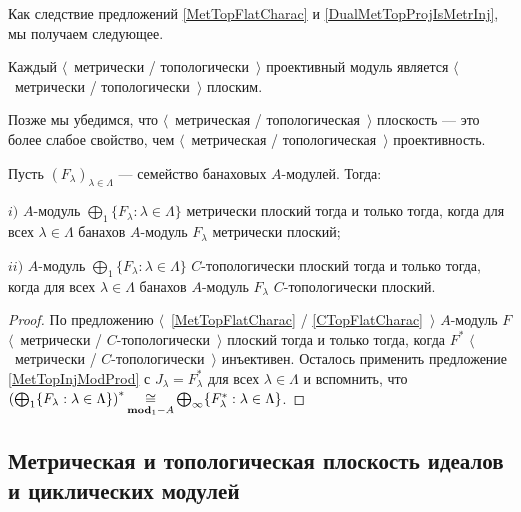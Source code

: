 Как следствие предложений \ref{MetTopFlatCharac} и \ref{DualMetTopProjIsMetrInj}, мы получаем следующее.

\begin{proposition}\label{MetTopProjIsMetTopFlat} Каждый $\langle$~метрически / топологически~$\rangle$ проективный модуль является $\langle$~метрически / топологически~$\rangle$ плоским.
\end{proposition}

Позже мы убедимся, что $\langle$~метрическая / топологическая~$\rangle$ плоскость --- это более слабое свойство, чем $\langle$~метрическая / топологическая~$\rangle$ проективность.

\begin{proposition}\label{MetTopFlatModCoProd} Пусть $(F_\lambda)_{\lambda\in\Lambda}$ --- семейство банаховых $A$-модулей. Тогда: 

$i)$ $A$-модуль $\bigoplus_1\{F_\lambda:\lambda\in\Lambda\}$ метрически плоский тогда и только тогда, когда для всех $\lambda\in\Lambda$ банахов $A$-модуль $F_\lambda$ метрически плоский;

$ii)$ $A$-модуль $\bigoplus_1\{F_\lambda:\lambda\in\Lambda\}$ $C$-топологически плоский тогда и только тогда, когда для всех $\lambda\in\Lambda$ банахов $A$-модуль $F_\lambda$ $C$-топологически плоский.
\end{proposition}
\begin{proof} По предложению  $\langle$~\ref{MetTopFlatCharac} / \ref{CTopFlatCharac}~$\rangle$ $A$-модуль $F$ $\langle$~метрически / $C$-топологически~$\rangle$ плоский тогда и только тогда, когда $F^*$ $\langle$~метрически / $C$-топологически~$\rangle$ инъективен. Осталось применить предложение \ref{MetTopInjModProd} с $J_\lambda=F_\lambda^*$ для всех $\lambda\in\Lambda$ и вспомнить, что $\left(\bigoplus_1\{ F_\lambda:\lambda\in\Lambda\}\right)^*\mathop{\mathbin{\cong}}\limits_{\mathbf{mod}_1-A}\bigoplus_\infty\{ F_\lambda^*:\lambda\in\Lambda\}$.
\end{proof}


\subsection{Метрическая и топологическая плоскость идеалов и циклических модулей}
\label{SubSectionMetricAndTopologicalFlatnessOfIdealsAndCyclicModules}

